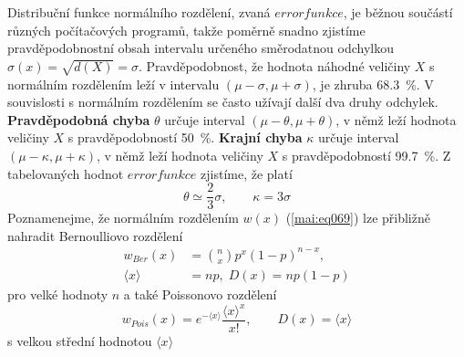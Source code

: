 \begin{mdframed}[style=mdexam]
\begin{example}
  Distribuční funkce normálního rozdělení, zvaná \(errorfunkce\), je běžnou součástí různých 
  počítačových programů, takže poměrně snadno zjistíme pravděpodobnostní obsah intervalu určeného 
  směrodatnou odchylkou \(\sigma(x) = \sqrt{d(X)} = \sigma\). Pravděpodobnost, že hodnota náhodné 
  veličiny \(X\) s normálním rozdělením leží v intervalu \((\mu - \sigma, \mu + \sigma)\), je 
  zhruba \qty{68.3}{\percent}. V souvislosti s normálním rozdělením se často užívají další 
  dva druhy odchylek. \textbf{Pravděpodobná chyba} \(\theta\) určuje interval \((\mu - \theta, \mu 
  + \theta)\), v  němž leží hodnota veličiny \(X\) s pravděpodobností \qty{50}{\percent}. 
  \textbf{Krajní chyba} \(\kappa\) určuje interval \((\mu - \kappa, \mu + \kappa)\), v němž leží 
  hodnota veličiny \(X\) s pravděpodobností \qty{99.7}{\percent}. Z tabelovaných hodnot 
  \(errorfunkce\) zjistíme, že platí
  \begin{equation}\label{mai:eq71}
   \theta \simeq \dfrac{2}{3}\sigma, \qquad \kappa = 3\sigma
  \end{equation}
  Poznamenejme, že normálním rozdělením \(w(x)\) (\ref{mai:eq069}) lze přibližně nahradit 
  Bernoulliovo rozdělení
  \begin{align*}
    w_{Ber}(x)        &= \binom{n}{x}p^x(1 - p)^{n-x},  \\
    \langle x \rangle &= np, \;  D(x) = np(1-p)
  \end{align*}
  pro velké hodnoty \(n\) a také Poissonovo rozdělení
  \begin{equation*}
    w_{Pois}(x) = e^{-\langle x \rangle}\dfrac{\langle x \rangle^x}{x!}, \qquad 
    D(x) = \langle x \rangle
  \end{equation*}
  s velkou střední hodnotou \(\langle x \rangle\)
\end{example}
\end{mdframed}